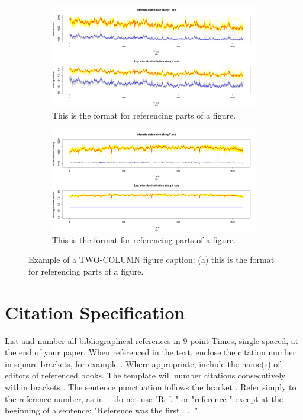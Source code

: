 \documentclass[conference]{IEEEtran}
\begin{document}
\begin{figure}[htb]
	\centering
	\begin{subfigure}[b]{.4\textwidth}
		\centering
		\includegraphics[width = \textwidth]{./figures/2a.png}
		\caption{This is the format for referencing parts of a figure.}\label{subfig:2a}
	\end{subfigure}
	\quad
	\begin{subfigure}[b]{.4\textwidth}
		\centering
		\includegraphics[width = \textwidth]{./figures/2b.png}
		\caption{This is the format for referencing parts of a figure.}\label{subfig:2b}
	\end{subfigure}
	\caption{Example of a TWO-COLUMN figure caption: (a) this is the format for referencing parts of a figure.}
	\label{fig:subfig}
\end{figure}

\section*{Citation Specification}
List and number all bibliographical references in 9-point Times, single-spaced, at the end of your paper. When referenced in the text, enclose the citation number in square brackets, for example \cite{b1}. Where appropriate, include the name(s) of editors of referenced books. The template will number citations consecutively within brackets \cite{b1}. The sentence punctuation follows the bracket \cite{b2}. Refer simply to the reference number, as in \cite{b3}—do not use "Ref. \cite{b3}" or "reference \cite{b3}" except at the beginning of a sentence: "Reference \cite{b3} was the first . . ."
\end{document}
